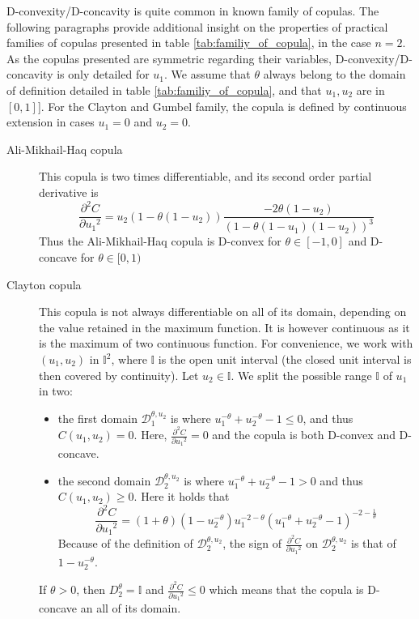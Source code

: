 D-convexity/D-concavity is quite common in known family of copulas. The following paragraphs provide additional insight on the properties of practical families of copulas presented in table \ref{tab:familiy_of_copula}, in the case $n=2$.
As the copulas presented are symmetric regarding their variables, D-convexity/D-concavity is only detailed for $u_1$. We assume that \( \theta \) always belong to the domain of definition detailed in table \ref{tab:familiy_of_copula}, and that \(u_1, u_2\) are in \([0, 1]\)]. For the Clayton and Gumbel family, the copula is defined by continuous extension in cases $u_1=0$ and $u_2=0$. 
\begin{description}
    \item[Ali-Mikhail-Haq copula] This copula is two times differentiable, and its second order partial derivative is
    $$\frac{\partial^2 C}{\partial {u_1}^2}=u_2(1-\theta(1-u_2))\frac{-2\theta(1-u_2)}{(1-\theta(1-u_1)(1-u_2))^3}$$
    Thus the Ali-Mikhail-Haq copula is D-convex for $\theta\in[-1,0]$ and D-concave for $\theta\in[0,1)$
    \item[Clayton copula] This copula is not always differentiable on all of its domain, depending on the value retained in the maximum function. It is however continuous as it is the maximum of two continuous function. For convenience, we work with $(u_1, u_2)$ in $\mathbb{I}^2$, where $\mathbb{I}$ is the open unit interval (the closed unit interval is then covered by continuity). Let $u_2\in\mathbb{I}$. We split the possible range $\mathbb{I}$ of $u_1$ in two:
\begin{itemize}
    \item the first domain $\mathcal{D}_1^{\theta,u_2}$ is where $u_1^{-\theta}+u_2^{-\theta}-1\leqslant0$, and thus $C(u_1, u_2)=0$. Here, $\frac{\partial^2 C}{\partial {u_1}^2}=0$ and the copula is both D-convex and D-concave.
    \item the second domain $\mathcal{D}_2^{\theta,u_2}$ is where $u_1^{-\theta}+u_2^{-\theta}-1>0$ and thus $C(u_1, u_2)\geqslant0$. Here it holds that
    $$\frac{\partial^2 C}{\partial {u_1}^2}=(1+\theta)(1-u_2^{-\theta})u_1^{-2-\theta}(u_1^{-\theta}+u_2^{-\theta}-1)^{-2-\frac{1}{\theta}}$$
    Because of the definition of $\mathcal{D}_2^{\theta,u_2}$, the sign of $\frac{\partial^2 C}{\partial {u_1}^2}$ on $\mathcal{D}_2^{\theta,u_2}$ is that of $1-u_2^{-\theta}$.
\end{itemize}

If $\theta>0$, then $D^\theta_2=\mathbb{I}$ and $\frac{\partial^2 C}{\partial {u_1}^2}\leqslant0$ which means that the copula is D-concave an all of its domain.


\end{description}
